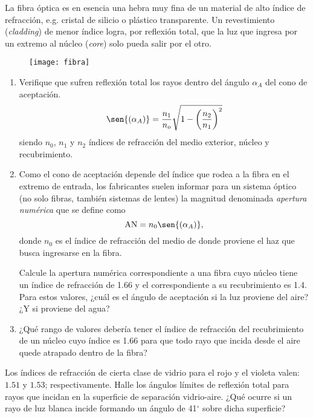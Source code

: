 \item
La fibra óptica es en esencia una hebra muy fina de un material de alto índice de refracción, e.g. cristal de silicio o plástico transparente.
Un revestimiento (\emph{cladding}) de menor índice logra, por reflexión total, que la luz que ingresa por un extremo al núcleo (\emph{core}) solo pueda salir por el otro.
\begin{figure}[ht]
	\centering{}\texttt{[image: fibra]}
\end{figure}
\begin{enumerate}
	\item Verifique que sufren reflexión total los rayos dentro del ángulo \(\alpha_A\) del cono de aceptación. 
	\[
		\sen{(\alpha_A)} = \frac{n_1}{n_o} \sqrt{1- \left( \frac{n_2}{n_1} \right)^2 }
	\]
	siendo \(n_0\), \(n_1\) y \(n_2\) índices de refracción del medio exterior, núcleo y recubrimiento.
	\item Como el cono de aceptación depende del índice que rodea a la fibra en el extremo de entrada, los fabricantes suelen informar para un sistema óptico (no solo fibras, también sistemas de lentes) la magnitud denominada \emph{apertura numérica} que se define como
	\[
		\text{AN} = n_0 \sen{(\alpha_A)},
	\]
	donde \(n_0\) es el índice de refracción del medio de donde proviene el haz que busca ingresarse en la fibra.

	Calcule la apertura numérica correspondiente a una fibra cuyo núcleo tiene un índice de refracción de \num{1.66} y el correspondiente a su recubrimiento es \num{1.4}.
	Para estos valores, ¿cuál es el ángulo de aceptación si la luz proviene del aire? ¿Y si proviene del agua?
	\item ¿Qué rango de valores debería tener el índice de refracción del recubrimiento de un núcleo cuyo índice es \num{1.66} para que todo rayo que incida desde el aire quede atrapado dentro de la fibra?
\end{enumerate}



\item Los índices de refracción de cierta clase de vidrio para el rojo y el violeta valen: $1.51$ y $1.53$; respectivamente.
Halle los ángulos límites de reflexión total para rayos que incidan en la superficie de separación vidrio-aire.
¿Qué ocurre si un rayo de luz blanca incide formando un ángulo de 41$^{\circ}$ sobre dicha superficie?
